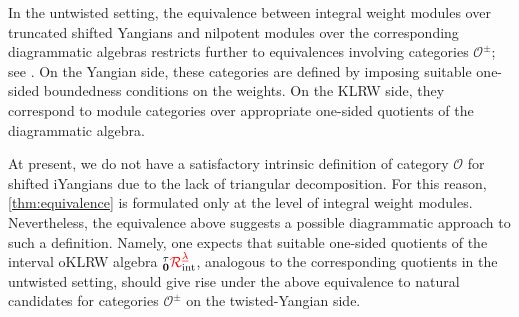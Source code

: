 \begin{remark}
In the untwisted setting, the equivalence between integral weight modules over
truncated shifted Yangians and nilpotent modules over the corresponding
diagrammatic algebras restricts further to equivalences involving categories
\(\mathcal O^{\pm}\); see \cite[Def.~5.20 and Thm.~5.21]{KTWWY19}. On the
Yangian side, these categories are defined by imposing suitable one-sided
boundedness conditions on the weights. On the KLRW side, they correspond to
module categories over appropriate one-sided quotients of the diagrammatic
algebra.

At present, we do not have a satisfactory intrinsic definition of category
\(\mathcal O\) for shifted iYangians due to the lack of triangular decomposition. For this reason, \cref{thm:equivalence} is formulated only at the level of integral weight modules.
Nevertheless, the equivalence above suggests a possible diagrammatic approach
to such a definition. Namely, one expects that suitable one-sided quotients of
the interval oKLRW algebra \({{}^\tau_{\mathbf{0}}{\color{red}\mathcal{R}}^{{{\color{red}\underline{\lambda}}}}_{\text{int}}}\), analogous to the corresponding
quotients in the untwisted setting, should give rise under the above
equivalence to natural candidates for categories
\(\mathcal O^{\pm}\) on the twisted-Yangian side.
\end{remark}


